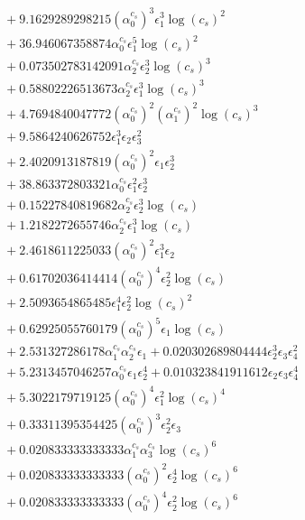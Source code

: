 \documentclass[10pt]{article}
\begin{document}
\begin{align*}
&{}  + 9.1629289298215 \left(\alpha_{0}^{c_s}\right)^{3} \epsilon_{1}^{3} \log{\left(c_{s} \right)}^{2} \\
&{}  + 36.946067358874 \alpha_{0}^{c_s} \epsilon_{1}^{5} \log{\left(c_{s} \right)}^{2} \\
&{}  + 0.073502783142091 \alpha_{2}^{c_s} \epsilon_{2}^{3} \log{\left(c_{s} \right)}^{3} \\
&{}  + 0.58802226513673 \alpha_{2}^{c_s} \epsilon_{1}^{3} \log{\left(c_{s} \right)}^{3} \\
&{}  + 4.7694840047772 \left(\alpha_{0}^{c_s}\right)^{2} \left(\alpha_{1}^{c_s}\right)^{2} \log{\left(c_{s} \right)}^{3} \\
&{}  + 9.5864240626752 \epsilon_{1}^{3} \epsilon_{2} \epsilon_{3}^{2} \\
&{}  + 2.4020913187819 \left(\alpha_{0}^{c_s}\right)^{2} \epsilon_{1} \epsilon_{2}^{3} \\
&{}  + 38.863372803321 \alpha_{0}^{c_s} \epsilon_{1}^{2} \epsilon_{2}^{3} \\
&{}  + 0.15227840819682 \alpha_{2}^{c_s} \epsilon_{2}^{3} \log{\left(c_{s} \right)} \\
&{}  + 1.2182272655746 \alpha_{2}^{c_s} \epsilon_{1}^{3} \log{\left(c_{s} \right)} \\
&{}  + 2.4618611225033 \left(\alpha_{0}^{c_s}\right)^{2} \epsilon_{1}^{3} \epsilon_{2} \\
&{}  + 0.61702036414414 \left(\alpha_{0}^{c_s}\right)^{4} \epsilon_{2}^{2} \log{\left(c_{s} \right)} \\
&{}  + 2.5093654865485 \epsilon_{1}^{4} \epsilon_{2}^{2} \log{\left(c_{s} \right)}^{2} \\
&{}  + 0.62925055760179 \left(\alpha_{0}^{c_s}\right)^{5} \epsilon_{1} \log{\left(c_{s} \right)} \\
&{}  + 2.531327286178 \alpha_{1}^{c_s} \alpha_{2}^{c_s} \epsilon_{1} + 0.020302689804444 \epsilon_{2}^{3} \epsilon_{3} \epsilon_{4}^{2} \\
&{}  + 5.2313457046257 \alpha_{0}^{c_s} \epsilon_{1} \epsilon_{2}^{4} + 0.010323841911612 \epsilon_{2} \epsilon_{3} \epsilon_{4}^{4} \\
&{}  + 5.3022179719125 \left(\alpha_{0}^{c_s}\right)^{4} \epsilon_{1}^{2} \log{\left(c_{s} \right)}^{4} \\
&{}  + 0.33311395354425 \left(\alpha_{0}^{c_s}\right)^{3} \epsilon_{2}^{2} \epsilon_{3} \\
&{}  + 0.020833333333333 \alpha_{1}^{c_s} \alpha_{3}^{c_s} \log{\left(c_{s} \right)}^{6} \\
&{}  + 0.020833333333333 \left(\alpha_{0}^{c_s}\right)^{2} \epsilon_{2}^{4} \log{\left(c_{s} \right)}^{6} \\
&{}  + 0.020833333333333 \left(\alpha_{0}^{c_s}\right)^{4} \epsilon_{2}^{2} \log{\left(c_{s} \right)}^{6}
\end{align*}
\end{document}
